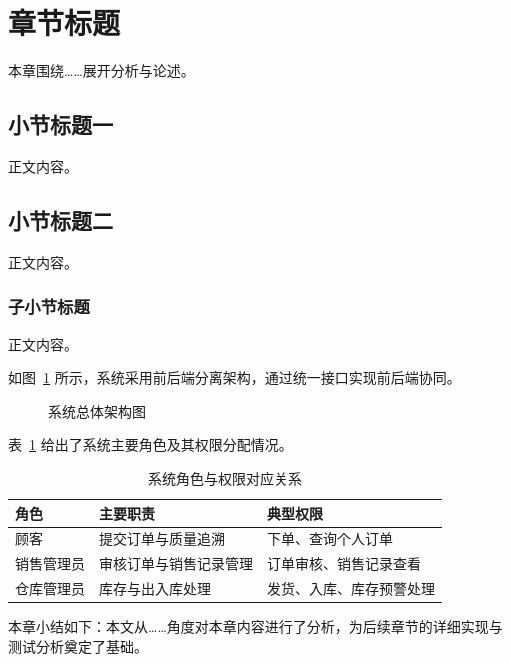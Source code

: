 \section{章节标题}

本章围绕……展开分析与论述。

\subsection{小节标题一}

正文内容。

\subsection{小节标题二}

正文内容。

\subsubsection{子小节标题}

正文内容。

如图~\ref{fig:system-arch} 所示，系统采用前后端分离架构，通过统一接口实现前后端协同。

\begin{figure}[htbp]
    \centering
    \caption{系统总体架构图}
    \label{fig:system-arch}
\end{figure}

表~\ref{tab:role-permission} 给出了系统主要角色及其权限分配情况。

\begin{table}[htbp]
    \centering
    \caption{系统角色与权限对应关系}
    \label{tab:role-permission}
    \begin{tabular}{lll}
        \hline
        角色 & 主要职责 & 典型权限 \\
        \hline
        顾客 & 提交订单与质量追溯 & 下单、查询个人订单 \\
        销售管理员 & 审核订单与销售记录管理 & 订单审核、销售记录查看 \\
        仓库管理员 & 库存与出入库处理 & 发货、入库、库存预警处理 \\
        \hline
    \end{tabular}
\end{table}

本章小结如下：本文从……角度对本章内容进行了分析，为后续章节的详细实现与测试分析奠定了基础。

